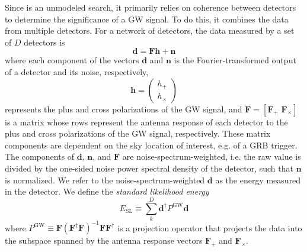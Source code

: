 Since \xpip is an unmodeled search, it primarily relies on coherence between detectors to determine the significance of a GW signal.
To do this, it combines the data from multiple detectors.
For a network of detectors, the data measured by a set of $D$ detectors is
\begin{equation}
	\mathbf{d} = \mathbf{F h} + \mathbf{n}
\end{equation}
where each component of the vectors $\mathbf{d}$ and $\mathbf{n}$ is the Fourier-transformed output of a detector and its noise, respectively,
\begin{equation}
	\mathbf{h} = \left( \begin{array}{c} h_+ \\ h_{\times} \end{array} \right)
\end{equation}
represents the plus and cross polarizations of the GW signal, and $\mathbf{F} = [\mathbf{F_+}\,\,\mathbf{F_\times}]$ is a matrix whose rows represent the antenna response of each detector to the plus and cross polarizations of the GW signal, respectively.
These matrix components are dependent on the sky location of interest, e.g. of a GRB trigger.
The components of $\mathbf{d}$, $\mathbf{n}$, and $\mathbf{F}$ are noise-spectrum-weighted, i.e. the raw value is divided by the one-sided noise power spectral density of the detector, such that $\mathbf{n}$ is normalized.
We refer to the noise-spectrum-weighted $\mathbf{d}$ as the energy measured in the detector.
We define the \textit{standard likelihood energy}
\begin{equation}\label{eq:grb-esl}
	E_{\mathrm{SL}} \equiv \sum_k^D \mathbf{d}^{\dagger} P^{\mathrm{GW}} \mathbf{d}
\end{equation}
where $P^{\mathrm{GW}} \equiv \mathbf{F} (\mathbf{F}^{\dagger} \mathbf{F})^{-1} \mathbf{F} \mathbf{F}^{\dagger}$ is a projection operator that projects the data into the subspace spanned by the antenna response vectors $\mathbf{F_+}$ and $\mathbf{F_\times}$.

